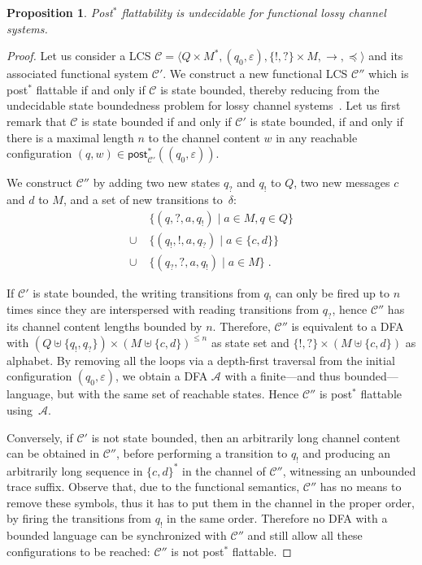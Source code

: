 \documentclass[11pt,reqno,a4paper]{amsart}
\newcommand{\tup}[1]{\langle #1\rangle}
\renewcommand{\cite}{\citep}
\theoremstyle{plain}
\newtheorem{proposition}[theorem]{Proposition}
\theoremstyle{definition}
\theoremstyle{remark}
\begin{document}
\begin{proposition}\label{propreachlcs}
  Post$^\ast$ flattability is undecidable for functional lossy channel
  systems.
\end{proposition}
\begin{proof}Let us consider a LCS $\mathcal{C}=\tup{Q\times
M^\ast,(q_0,\varepsilon),\{!,?\}\times M,{\rightarrow},{\preceq}}$ and its
associated functional system $\mathcal{C}'$.  We construct a new
functional LCS $\mathcal{C}''$ which is post$^\ast$ flattable if and
only if $\mathcal{C}$ is state bounded, thereby reducing from the
undecidable state boundedness problem for lossy channel
systems~\cite{boundedRPN}.  Let us first remark that $\mathcal{C}$ is
state bounded if and only if $\mathcal{C}'$ is state bounded, if and
only if there is a maximal length $n$ to the channel content $w$ in any
reachable configuration
$(q,w)\in\mathsf{post}^\ast_{\mathcal{C}'}((q_0,\varepsilon))$.

We construct $\mathcal{C}''$ by adding two new states $q_?$ and $q_!$ to
$Q$, two new messages $c$ and $d$ to $M$, and a set of new
transitions to~$\delta$:
\begin{align*}
  &\{(q,?,a,q_!)\mid a\in M,q\in Q\}\\\cup\;&\{(q_!,!,a,q_?)\mid a\in\{c,d\}\}\\\cup\;&\{(q_?,?,a,q_!)\mid a\in M\}\;.
\end{align*}

If $\mathcal{C}'$ is state bounded, the writing transitions from $q_!$ can
only be fired up to $n$ times since they are interspersed with reading
transitions from $q_?$, hence $\mathcal{C}''$ has its channel
content lengths bounded by $n$.  Therefore, $\mathcal{C}''$ is
equivalent to a DFA with $(Q\uplus\{q_!,q_?\})\times
(M\uplus\{c,d\})^{\leq n}$ as state set and $\{!,?\}\times
(M\uplus\{c,d\})$ as alphabet.  By removing all the loops via a
depth-first traversal from the initial configuration
$(q_0,\varepsilon)$, we obtain a DFA $\mathcal{A}$ with a finite---and
thus bounded---language, but with the same set of reachable states.
Hence $\mathcal{C}''$ is post$^\ast$ flattable using~$\mathcal{A}$.

Conversely, if $\mathcal{C}'$ is not state bounded, then an arbitrarily
long channel content can be obtained in $\mathcal{C}''$, before
performing a transition to $q_!$ and producing an arbitrarily long
sequence in $\{c,d\}^\ast$ in the channel of $\mathcal{C}''$, witnessing
an unbounded trace suffix.  Observe that, due to the functional semantics,
$\mathcal{C}''$ has no means to remove these symbols, thus it has to put
them in the channel in the proper order, by firing the transitions from
$q_!$ in the same order.  Therefore no DFA with a bounded language can
be synchronized with $\mathcal{C}''$ and still allow all these
configurations to be reached: $\mathcal{C}''$ is not post$^\ast$
flattable.
\end{proof}
\end{document}
